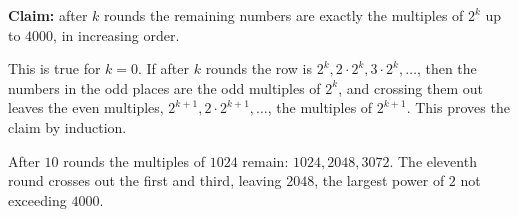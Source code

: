 \textbf{Claim:} after $k$ rounds the remaining numbers are exactly the multiples of $2^k$ up to $4000$, in increasing order.

This is true for $k=0$. If after $k$ rounds the row is $2^k,2\cdot2^k,3\cdot2^k,\dots$, then the numbers in the odd places are the odd multiples of $2^k$, and crossing them out leaves the even multiples, $2^{k+1},2\cdot2^{k+1},\dots$, the multiples of $2^{k+1}$. This proves the claim by induction.

After $10$ rounds the multiples of $1024$ remain: $1024,2048,3072$. The eleventh round crosses out the first and third, leaving $\boxed{2048}$, the largest power of $2$ not exceeding $4000$.

